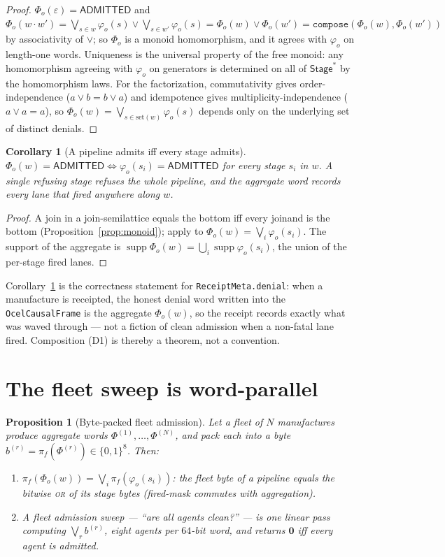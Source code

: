 \documentclass[11pt,oneside]{book}
\theoremstyle{definition}
\theoremstyle{plain}
\newtheorem{proposition}[theorem]{Proposition}
\newtheorem{corollary}[theorem]{Corollary}
\theoremstyle{remark}
\DeclareMathOperator{\supp}{supp}
\newcommand{\code}[1]{\texttt{#1}}
\newcommand{\Adml}{\mathsf{ADMITTED}}          %
\newcommand{\firedmap}{\pi_{f}}                %
\begin{document}
\begin{proof}
$\Phi_o(\varepsilon)=\Adml$ and $\Phi_o(w\cdot w')=\bigvee_{s\in w}\varphi_o(s)\lor
\bigvee_{s\in w'}\varphi_o(s)=\Phi_o(w)\lor\Phi_o(w')=\code{compose}(\Phi_o(w),\Phi_o(w'))$
by associativity of $\lor$; so $\Phi_o$ is a monoid homomorphism, and it agrees with
$\varphi_o$ on length-one words. Uniqueness is the universal property of the free monoid: any
homomorphism agreeing with $\varphi_o$ on generators is determined on all of
$\mathsf{Stage}^{*}$ by the homomorphism laws. For the factorization, commutativity gives
order-independence ($a\lor b=b\lor a$) and idempotence gives multiplicity-independence
($a\lor a=a$), so $\Phi_o(w)=\bigvee_{s\in\mathrm{set}(w)}\varphi_o(s)$ depends only on the
underlying set of distinct denials. \end{proof}

\begin{corollary}[A pipeline admits iff every stage admits]\label{cor:allstages}
$\Phi_o(w)=\Adml\iff\varphi_o(s_i)=\Adml$ for every stage $s_i$ in $w$. A single refusing stage
refuses the whole pipeline, and the aggregate word records \emph{every} lane that fired
anywhere along $w$.
\end{corollary}

\begin{proof}
A join in a join-semilattice equals the bottom iff every joinand is the bottom
(Proposition~\ref{prop:monoid}); apply to $\Phi_o(w)=\bigvee_i\varphi_o(s_i)$. The support of
the aggregate is $\supp\Phi_o(w)=\bigcup_i\supp\varphi_o(s_i)$, the union of the per-stage fired
lanes. \end{proof}

Corollary~\ref{cor:allstages} is the correctness statement for \code{ReceiptMeta.denial}: when
a manufacture is receipted, the honest denial word written into the \code{OcelCausalFrame} is
the aggregate $\Phi_o(w)$, so the receipt records exactly what was waved through --- not a
fiction of clean admission when a non-fatal lane fired. Composition (D1) is thereby a theorem,
not a convention.

\section{The fleet sweep is word-parallel}

\begin{proposition}[Byte-packed fleet admission]\label{prop:fleet}
Let a fleet of $N$ manufactures produce aggregate words $\Phi^{(1)},\dots,\Phi^{(N)}$, and pack
each into a byte $b^{(r)}=\firedmap(\Phi^{(r)})\in\{0,1\}^{8}$. Then:
\begin{enumerate}[label=(\roman*),leftmargin=*]
\item $\firedmap(\Phi_o(w))=\bigvee_{i}\firedmap(\varphi_o(s_i))$: the fleet byte of a pipeline
equals the bitwise \textsc{or} of its stage bytes (fired-mask commutes with aggregation).
\item A fleet admission sweep --- ``are all agents clean?'' --- is one linear pass computing
$\bigvee_r b^{(r)}$, eight agents per $64$-bit word, and returns $\bm 0$ iff every agent is
admitted.
\end{enumerate}
\end{proposition}
\end{document}
